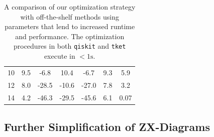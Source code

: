 \begin{table}[t]
{\begin{tabular}{@{}ccccccc@{}}
  10                               & 9.5      & -6.8     & 10.4     & -6.7     & 9.3         & 5.9         \\
  12                               & 8.0      & -28.5     & -10.6     & -27.0     & 7.8         & 3.2         \\
  14                               & 4.2      & -46.3     & -29.5     & -45.6     & 6.1         & 0.07         \\
  \bottomrule
  \end{tabular}}
  \caption{\label{tab:compare-results}
    A comparison of our optimization strategy with off-the-shelf methods using parameters that lend to increased runtime and performance.
    The optimization procedures in both {\color{gray}\texttt{qiskit}} and {\color{gray}\texttt{tket}} execute in $<1\text{s}$.
  }
\end{table}

\iffalse
\subsection*{Further Simplification of ZX-Diagrams}

